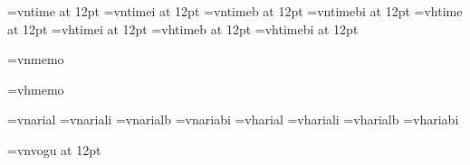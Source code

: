 
\font\vntime=vntime at 12pt 
\font\vntimei=vntimei  at 12pt     
\font\vntimeb=vntimeb  at 12pt 
\font\vntimebi=vntimebi  at 12pt 
\font\vhtime=vhtime  at 12pt 
\font\vhtimei=vhtimei  at 12pt 
\font\vhtimeb=vhtimeb  at 12pt 
\font\vhtimebi=vhtimebi  at 12pt 

 \font\vnmemo=vnmemo 

 \font\tth=vhmemo 

 \font\vnaria=vnarial 
 \font\sfit=vnariali 
 \font\sfbf=vnarialb 
 \font\sfbfit=vnariabi 
 \font\sfh=vharial 
 \font\sfith=vhariali 
 \font\sfbfh=vharialb 
 \font\sfbfith=vhariabi 

\font\vnvogu=vnvogu  at 12pt 

\def\rm{\vntime}  
\def\bf{\vntimeb}
\def\it{\vntimei} 
\def\bfit{\vntimebi}  
\def\sf{\vnaria}
\def\tt{\vnmemo}  
  
\def\rmh{\vhtime}  
\def\bfh{\vhtimeb}  
\def\ith{\vhtimei}  
\def\bfith{\vhtimebi}  

\rm